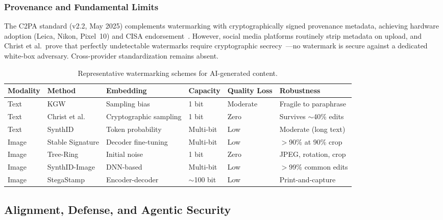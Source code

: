 \subsubsection{Provenance and Fundamental Limits}
\label{sec:provenance}

The C2PA standard (v2.2, May 2025) complements watermarking with cryptographically signed provenance metadata, achieving hardware adoption (Leica, Nikon, Pixel~10) and CISA endorsement~\cite{c2pa2025,cisa2025cc}. However, social media platforms routinely strip metadata on upload, and Christ et al.\ prove that perfectly undetectable watermarks require cryptographic secrecy~\cite{christ2024undetectable}---no watermark is secure against a dedicated white-box adversary. Cross-provider standardization remains absent.

\begin{table}[htbp]
\centering
\caption{Representative watermarking schemes for AI-generated content.}
\label{tab:watermark}
\small
\begin{tabular}{p{1.2cm}p{2.2cm}p{2.0cm}p{1.5cm}p{1.5cm}p{3.5cm}}
\toprule
\textbf{Modality} & \textbf{Method} & \textbf{Embedding} & \textbf{Capacity} & \textbf{Quality Loss} & \textbf{Robustness} \\
\midrule
Text & KGW & Sampling bias & 1 bit & Moderate & Fragile to paraphrase \\
\addlinespace
Text & Christ et al. & Cryptographic sampling & 1 bit & Zero & Survives $\sim$40\% edits \\
\addlinespace
Text & SynthID & Token probability & Multi-bit & Low & Moderate (long text) \\
\addlinespace
Image & Stable Signature & Decoder fine-tuning & Multi-bit & Low & $>$90\% at 90\% crop \\
\addlinespace
Image & Tree-Ring & Initial noise & 1 bit & Zero & JPEG, rotation, crop \\
\addlinespace
Image & SynthID-Image & DNN-based & Multi-bit & Low & $>$99\% common edits \\
\addlinespace
Image & StegaStamp & Encoder-decoder & $\sim$100 bit & Low & Print-and-capture \\
\bottomrule
\end{tabular}
\end{table}


\subsection{Alignment, Defense, and Agentic Security}
\label{sec:alignment}

